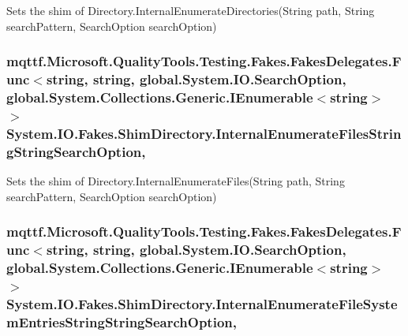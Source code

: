Sets the shim of Directory.\-Internal\-Enumerate\-Directories(\-String path, String search\-Pattern, Search\-Option search\-Option)

\hypertarget{class_system_1_1_i_o_1_1_fakes_1_1_shim_directory_a8c9a58e3a0ee02c099de76a06796cb27}{
\subsubsection[{Internal\-Enumerate\-Files\-String\-String\-Search\-Option}]{\setlength{\rightskip}{0pt plus 5cm}mqttf.\-Microsoft.\-Quality\-Tools.\-Testing.\-Fakes.\-Fakes\-Delegates.\-Func$<$string, string, global.\-System.\-I\-O.\-Search\-Option, global.\-System.\-Collections.\-Generic.\-I\-Enumerable$<$string$>$ $>$ System.\-I\-O.\-Fakes.\-Shim\-Directory.\-Internal\-Enumerate\-Files\-String\-String\-Search\-Option\hspace{0.3cm}{\ttfamily [static]}, {\ttfamily [set]}}}\label{class_system_1_1_i_o_1_1_fakes_1_1_shim_directory_a8c9a58e3a0ee02c099de76a06796cb27}


Sets the shim of Directory.\-Internal\-Enumerate\-Files(\-String path, String search\-Pattern, Search\-Option search\-Option)

\hypertarget{class_system_1_1_i_o_1_1_fakes_1_1_shim_directory_ac6cf2147847bee1736b17d6ecc8e6d5a}{
\subsubsection[{Internal\-Enumerate\-File\-System\-Entries\-String\-String\-Search\-Option}]{\setlength{\rightskip}{0pt plus 5cm}mqttf.\-Microsoft.\-Quality\-Tools.\-Testing.\-Fakes.\-Fakes\-Delegates.\-Func$<$string, string, global.\-System.\-I\-O.\-Search\-Option, global.\-System.\-Collections.\-Generic.\-I\-Enumerable$<$string$>$ $>$ System.\-I\-O.\-Fakes.\-Shim\-Directory.\-Internal\-Enumerate\-File\-System\-Entries\-String\-String\-Search\-Option\hspace{0.3cm}{\ttfamily [static]}, {\ttfamily [set]}}}\label{class_system_1_1_i_o_1_1_fakes_1_1_shim_directory_ac6cf2147847bee1736b17d6ecc8e6d5a}


